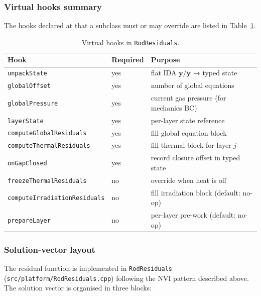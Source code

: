 \documentclass[11pt,a4paper]{article}
\begin{document}
\subsubsection*{Virtual hooks summary}

The hooks declared at  that a subclass must or may override are listed in Table~\ref{tab:hooks}.

\begin{table}[h]
\centering
\caption{Virtual hooks in \texttt{RodResiduals}.}
\label{tab:hooks}
\small
\begin{tabular}{llp{6cm}}
  \toprule
  Hook & Required & Purpose \\
  \midrule
  \texttt{unpackState}               & yes & flat IDA $\mathbf{y}/\dot{\mathbf{y}}$ → typed state \\
  \texttt{globalOffset}              & yes & number of global equations \\
  \texttt{globalPressure}            & yes & current gas pressure (for mechanics BC) \\
  \texttt{layerState}                & yes & per-layer state reference \\
  \texttt{computeGlobalResiduals}    & yes & fill global equation block \\
  \texttt{computeThermalResiduals}   & yes & fill thermal block for layer $j$ \\
  \texttt{onGapClosed}               & yes & record closure offset in typed state \\
  \texttt{freezeThermalResiduals}    & no  & override when heat is off \\
  \texttt{computeIrradiationResiduals} & no & fill irradiation block (default: no-op) \\
  \texttt{prepareLayer}              & no  & per-layer pre-work (default: no-op) \\
  \bottomrule
\end{tabular}
\end{table}

\subsubsection*{Solution-vector layout}
\label{subsec:yvec_layout}

The residual function is implemented in \texttt{RodResiduals} (\texttt{src/platform/RodResiduals.cpp}) following the NVI pattern described above.  The solution vector is organised in three blocks:
\end{document}
